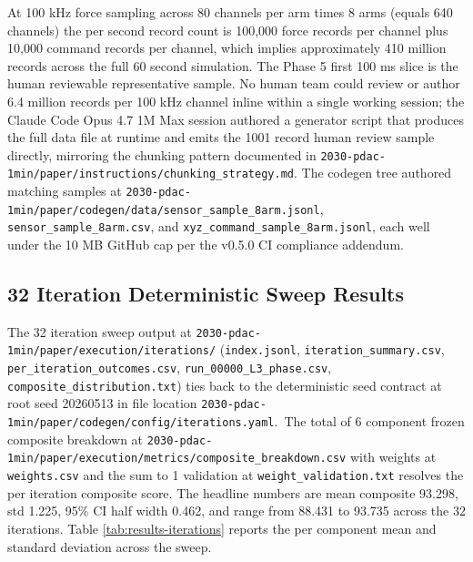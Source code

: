 At 100 kHz force sampling across 80 channels per arm times 8 arms
(equals 640 channels) the per second record count is 100,000 force
records per channel plus 10,000 command records per channel, which
implies approximately 410 million records across the full 60
second simulation. The Phase 5 first 100 ms slice is the human
reviewable representative sample. No human team could review or
author 6.4 million records per 100 kHz channel inline within a
single working session; the Claude Code Opus 4.7 1M Max session
authored a generator script that produces the full data file at
runtime and emits the 1001 record human review sample directly,
mirroring the chunking pattern documented in
\texttt{2030-pdac-1min/paper/instructions/chunking_strategy.md}.
The codegen tree authored matching samples at
\texttt{2030-pdac-1min/paper/codegen/data/sensor_sample_8arm.jsonl},
\texttt{sensor_sample_8arm.csv}, and
\texttt{xyz_command_sample_8arm.jsonl}, each well under the 10 MB
GitHub cap per the v0.5.0 CI compliance addendum.

\subsection{32 Iteration Deterministic Sweep Results}
\label{sec:results-iterations}

The 32 iteration sweep output at
\texttt{2030-pdac-1min/paper/execution/iterations/}
(\texttt{index.jsonl}, \texttt{iteration_summary.csv},
\texttt{per_iteration_outcomes.csv}, \texttt{run_00000_L3_phase.csv},
\texttt{composite_distribution.txt}) ties back to the deterministic
seed contract at root seed 20260513 in file location
\texttt{2030-pdac-1min/paper/codegen/config/iterations.yaml}.\ The total of 6 component frozen composite breakdown at
\texttt{2030-pdac-1min/paper/execution/metrics/composite_breakdown.csv}
with weights at \texttt{weights.csv} and the sum to 1 validation
at \texttt{weight_validation.txt} resolves the per iteration
composite score. The headline numbers are mean composite 93.298,
std 1.225, 95\% CI half width 0.462, and range from 88.431 to
93.735 across the 32 iterations. Table
\ref{tab:results-iterations} reports the per component mean and
standard deviation across the sweep.

